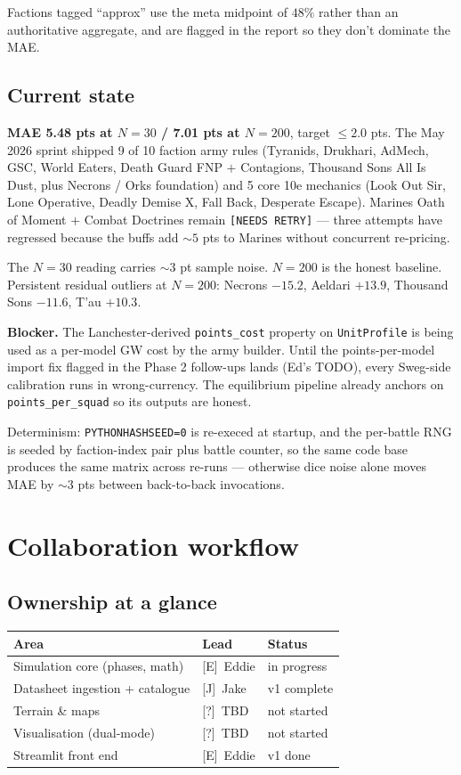 \documentclass[11pt,a4paper]{article}
\newcommand{\eddie}{\textcolor{eddieblue}{\textsf{[E]}}}
\newcommand{\jake}{\textcolor{jakeorange}{\textsf{[J]}}}
\newcommand{\either}{\textcolor{eithergrey}{\textsf{[?]}}}
\begin{document}
Factions tagged ``approx'' use the meta midpoint of $48\%$ rather than
an authoritative aggregate, and are flagged in the report so they don't
dominate the MAE.

\subsection{Current state}
\textbf{MAE 5.48 pts at $N{=}30$ / 7.01 pts at $N{=}200$}, target $\le 2.0$
pts. The May 2026 sprint shipped 9 of 10 faction army rules (Tyranids,
Drukhari, AdMech, GSC, World Eaters, Death Guard FNP $+$ Contagions,
Thousand Sons All Is Dust, plus Necrons / Orks foundation) and 5 core 10e
mechanics (Look Out Sir, Lone Operative, Deadly Demise X, Fall Back,
Desperate Escape). Marines Oath of Moment $+$ Combat Doctrines remain
\texttt{[NEEDS RETRY]} --- three attempts have regressed because the
buffs add ${\sim}5$ pts to Marines without concurrent re-pricing.

The $N{=}30$ reading carries ${\sim}3$ pt sample noise. $N{=}200$ is the
honest baseline. Persistent residual outliers at $N{=}200$: Necrons
$-15.2$, Aeldari $+13.9$, Thousand Sons $-11.6$, T'au $+10.3$.

\textbf{Blocker.} The Lanchester-derived \texttt{points\_cost} property
on \texttt{UnitProfile} is being used as a per-model GW cost by the army
builder. Until the points-per-model import fix flagged in the Phase 2
follow-ups lands (Ed's TODO), every Sweg-side calibration runs in
wrong-currency. The equilibrium pipeline already anchors on
\texttt{points\_per\_squad} so its outputs are honest.

Determinism: \texttt{PYTHONHASHSEED=0} is re-execed at startup, and the
per-battle RNG is seeded by faction-index pair plus battle counter, so
the same code base produces the same matrix across re-runs --- otherwise
dice noise alone moves MAE by ${\sim}3$ pts between back-to-back
invocations.

\section{Collaboration workflow}

\subsection{Ownership at a glance}
\begin{tabular}{lll}
\toprule
Area & Lead & Status \\
\midrule
Simulation core (phases, math)    & \eddie\ Eddie & in progress \\
Datasheet ingestion + catalogue   & \jake\ Jake   & v1 complete \\
Terrain \& maps                   & \either\ TBD  & not started \\
Visualisation (dual-mode)         & \either\ TBD  & not started \\
Streamlit front end               & \eddie\ Eddie & v1 done \\
\bottomrule
\end{tabular}
\end{document}
